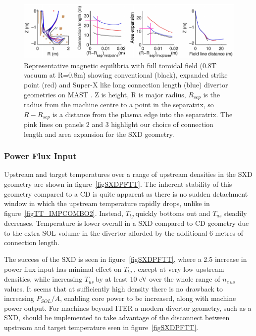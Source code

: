 \documentclass[12pt]{article}  %
\providecommand{\neus}{$n_{e~us}~$} %
\providecommand{\Tus}{$T_{us}~$} %
\providecommand{\Ttg}{$T_{tg}~$} %
\begin{document}
\begin{figure}
\includegraphics[scale=0.75]{Figures/MASTUdesignpapersFig2_2.png}
\centering
\caption{Representative magnetic equilibria with full toroidal field (0.8T vacuum at R=0.8m) showing conventional (black), expanded strike point (red) and Super-X like long connection length (blue) divertor geometries on MAST \cite{Fishpool2013}. Z is height, R is major radius, $ R_{sep} $ is the radius from the machine centre to a point in the separatrix, so $ R - R_{sep} $ is a distance from the plasma edge into the separatrix. The pink lines on panels 2 and 3 highlight our choice of connection length and area expansion for the SXD geometry.}\label{figMASTUdesignpapersFig2}
\end{figure}


\subsubsection{Power Flux Input}\label{sssecPF}
Upstream and target temperatures over a range of upstream densities in the SXD geometry are shown in figure~\ref{figSXDPFTT}. The inherent stability of this geometry compared to a CD is quite apparent as there is no sudden detachment window in which the upstream temperature rapidly drops, unlike in figure~\ref{figTT_IMPCOMBO2}. Instead, \Ttg quickly bottoms out and \Tus steadily decreases. Temperature is lower overall in a SXD compared to CD geometry due to the extra SOL volume in the divertor afforded by the additional 6 metres of connection length. 

The success of the SXD is seen in figure~\ref{figSXDPFTT}, where a 2.5 increase in power flux input has minimal effect on \Ttg, except at very low upstream densities, while increasing \Tus by at least 10 eV over the whole range of \neus values. It seems that at sufficiently high density there is no drawback to increasing $P_{SOL}/A$, enabling core power to be increased, along with machine power output. For machines beyond ITER a modern divertor geometry, such as a SXD, should be implemented to take advantage of the disconnect between upstream and target temperature seen in figure~\ref{figSXDPFTT}.
\end{document}
